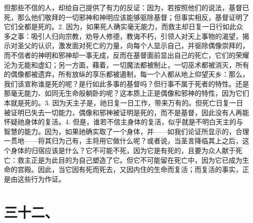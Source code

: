 但那些不信的人，却给自己提供了有力的反证：因为，若按照他们的说法，基督已死，那么他们敬拜的一切邪神和神明应该能够驱除基督；但事实相反，基督证明了它们全都是死的。2. 因为，如果死人确实毫无能力，而救主却日复一日行如此众多之事：吸引人归向宗教，劝导人修德，教诲不朽，引领人对天上事物的渴望，揭示对圣父的认识，激发面对死亡的力量，向每个人显示自己，并驱除偶像崇拜的，而不信者的神明和邪神却一事无成，反而在基督面前显出自己的死亡，它们的荣耀沦为无能和虚幻；另一方面，藉着，一切魔法都被制止，一切巫术都被消灭，所有的偶像都被遗弃，所有放纵的享乐都被遏制，每一个人都从地上仰望天乡：那么，我们该宣称谁是死的呢？是行如此多事的基督吗？但行事不属于死者的特性。还是那毫无能力、如同无生命般躺卧的呢？这本质上正是偶像和邪神的特性，因为它们本就是死的。3. 因为天主子是，祂日复一日工作，带来万有的。但死亡日复一日被证明已失去一切能力，偶像和邪神被证明是死的，而不是基督，因此没有人再能怀疑祂身体的复活。4. 但是，谁若不信主身体的复活，似乎就是不明白天主的与智慧的能力。因为，如果祂确实取了一个身体，并——如我们论证所显示的，合理一贯地——将其归为己有，主将用它做什么呢？或者说，当圣言降临其上之后，这个身体的归宿应该是什么？它不可能不死，因为它是有死的，且要为众人献于死亡：救主正是为此目的为自己塑造了它。但它不可能留在死亡中，因为它已成为生命的宫殿。因此，当它因有死而死去，又因内住的生命而复活；而复活的事实，正是由这些行为作证。\par


\section{三十二、}

